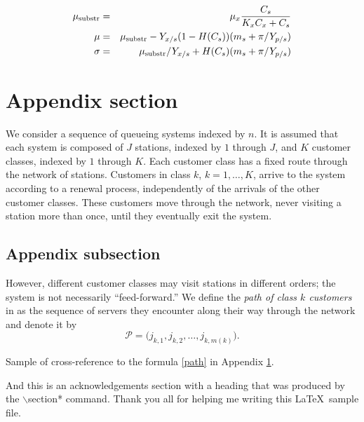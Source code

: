 \documentclass[ss]{imsart}
\numberwithin{equation}{section}
\theoremstyle{plain}
\begin{document}
\begin{eqnarray}
 \mu_{\rm substr} & = & \mu_{x} \frac{C_{s}}{K_{x}C_{x}+C_{s}}  \\
 \mu              & = & \mu_{\rm substr} - Y_{x/s}(1-H(C_{s}))(m_{s}+\pi /Y_{p/s}) \\
 \sigma           & = & \mu_{\rm substr}/Y_{x/s}+ H(C_{s}) (m_{s}+ \pi /Y_{p/s})
\end{eqnarray}

\appendix

\section{Appendix section}\label{app}

We consider a sequence of queueing systems
indexed by $n$.  It is assumed that each system
is composed of $J$ stations, indexed by $1$
through $J$, and $K$ customer classes, indexed
by $1$ through $K$.  Each customer class
has a fixed route through the network of
stations.  Customers in class
$k$, $k=1,\ldots,K$, arrive to the
system according to a
renewal process, independently of the arrivals
of the other customer classes.  These customers
move through the network, never visiting a station
more than once, until they eventually exit
the system.

\subsection{Appendix subsection}

However, different customer classes may visit
stations in different orders; the system
is not necessarily ``feed-forward.''
We define the {\em path of class $k$ customers} in
as the sequence of servers
they encounter along their way through the network
and denote it by
\begin{equation}
\mathcal{P}=\bigl(j_{k,1},j_{k,2},\dots,j_{k,m(k)}\bigr). \label{path}
\end{equation}

Sample of cross-reference to the formula \ref{path} in Appendix \ref{app}.

\begin{acks}[Acknowledgments]
And this is an acknowledgements section with a heading that was produced by the
$\backslash$section* command. Thank you all for helping me writing this
\LaTeX\ sample file.
\end{acks}

\begin{supplement}
\end{supplement}
\begin{supplement}
\end{supplement}
\end{document}
